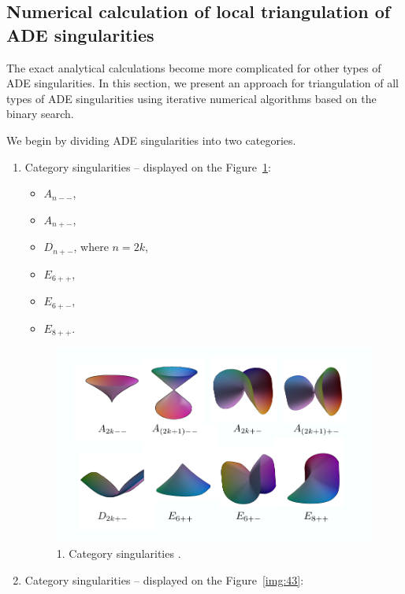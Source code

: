\subsection{Numerical calculation of local triangulation of ADE singularities}

The exact analytical calculations become more
complicated for other types of ADE singularities. In this section, we present an approach for triangulation of all types
of ADE singularities using iterative numerical algorithms based on the binary 
search.

We begin by dividing ADE singularities into two categories.
\begin{enumerate}
    \item Category singularities -- displayed on the Figure~\ref{img:42}:
    \begin{itemize}
        \item $A_{n--}$,
        \item $A_{n+-}$,
        \item $D_{n+-}$, where $n=2k$,
        \item $E_{6++}$, 
        \item $E_{6+-}$,
        \item $E_{8++}$.
    \end{itemize}
    \begin{figure}
        \centerline{\includegraphics[scale=0.5]{images/img42}}
        \caption[1. Category singularities]
        {1. Category singularities \cite{morris2003client}.}
        \label{img:42}
    \end{figure}
    \item Category singularities -- displayed on the Figure~\ref{img:43}:

\end{enumerate}
